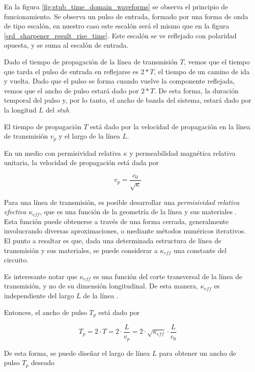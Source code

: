 En la figura \ref{fig:stub_time_domain_waveforms} se observa el principio de
funcionamiento. Se observa un pulso de entrada, formado por una forma de onda de
tipo escalón, en nuestro caso este escalón será el mismo que en la figura
\ref{srd_sharpener_result_rise_time}. Este escalón se ve reflejado con polaridad
opuesta, y se suma al escalón de entrada.

Dado el tiempo de propagación de la línea de transmisión $T$, vemos que el
tiempo que tarda el pulso de entrada en reflejarse es $2*T$, el tiempo de un
camino de ida y vuelta. Dado que el pulso se forma cuando vuelve la componente
reflejada, vemos que el ancho de pulso estará dado por $2*T$. De esta forma, la
duración temporal del pulso y, por lo tanto, el ancho de banda del sistema,
estará dado por la longitud $L$ del \textit{stub}.

El tiempo de propagación $T$ está dado por la velocidad de propagación en la
línea de transmisión $v_p$ y el largo de la línea $L$.

En un medio con permisividad relativa $\kappa$ y permeabilidad magnética
relativa unitaria, la velocidad de propagación está dada por \cite{pozar2011}

\begin{equation}
  v_p = \frac{c_0}{\sqrt{\kappa}}
\end{equation}

Para una línea de transmisión, es posible desarrollar una \textit{permisividad
relativa efectiva} $\kappa_{eff}$, que es una función de la geometría de la
línea y sus materiales \cite{pozar2011}. Esta función puede obtenerse a través
de una forma cerrada, generalmente involucrando diversas aproximaciones, o
mediante métodos numéricos iterativos. El punto a resaltar es que, dada una
determinada estructura de línea de transmisión y sus materiales, se puede
considerar a $\kappa_{eff}$ una constante del circuito.

Es interesante notar que $\kappa_{eff}$ es una función del corte transversal de
la línea de transmisión, y no de su dimensión longitudinal. De esta manera,
$\kappa_{eff}$ es independiente del largo $L$ de la línea \cite{pozar2011}.

Entonces, el ancho de pulso $T_p$ está dado por

\begin{equation}
    T_p = 2 \cdot T = 2 \cdot \frac{L}{v_p} =2 \cdot \sqrt{\kappa_{eff}} \cdot \frac{L}{c_0}
\end{equation}

De esta forma, se puede diseñar el largo de línea $L$ para obtener un ancho de
pulso $T_p$ deseado

